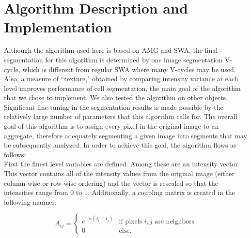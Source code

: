 \documentclass[12pt]{article}%
\begin{document}
\section{Algorithm Description and Implementation}
Although the algorithm used here is based on AMG and SWA, the final segmentation for this algorithm is determined by one image segmentation V-cycle, which is different from regular SWA where many V-cycles may be used.  Also, a measure of ``texture," obtained by comparing intensity variance at each level improves performance of cell segmentation, the main goal of the algorithm that we chose to implement. We also tested the algorithm on other objects. Significant fine-tuning in the segmentation results is made possible by the relatively large number of parameters that this algorithm calls for. The overall goal of this algorithm is to assign every pixel in the original image to an aggregate, therefore adequately segmenting a given image into segments that may be subsequently analyzed. In order to achieve this goal, the algorithm flows as follows:
\vspace{5mm}\\
First the finest level variables are defined. Among these are an intensity vector. This vector contains all of the intensity values from the original image (either column-wise or row-wise ordering) and the vector is rescaled so that the intensities range from $0$ to $1$.  Additionally, a coupling matrix is created in the following manner: 

$$ A_{ij} = \begin{cases} e^{-\alpha(I_i-I_j)} &\mbox{if pixels } i, j \mbox{\ \ are neighbors} \\ 0 & \mbox{else. } \end{cases} $$ 
\end{document}
